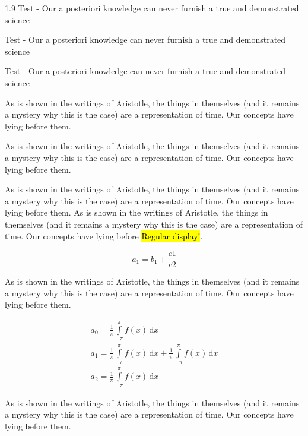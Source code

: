 \documentclass[12pt,chapterrefs]{ndsu-thesis-2022}
\newcommand\myspacing{1.9} %
\begin{document}
\begin{spacing}{\myspacing}
Test - Our a posteriori knowledge can never furnish a true and demonstrated science


Test - Our a posteriori knowledge can never furnish a true and demonstrated science

Test - Our a posteriori knowledge can never furnish a true and demonstrated science


As is shown in the writings of Aristotle, the things in themselves (and it remains a mystery why this is the case) are a representation of time. Our concepts have lying before them.


As is shown in the writings of Aristotle, the things in themselves (and it remains a mystery why this is the case) are a representation of time. Our concepts have lying before them.


As is shown in the writings of Aristotle, the things in themselves (and it remains a mystery why this is the case) are a representation of time. Our concepts have lying before them. As is shown in the writings of Aristotle, the things in themselves (and it remains a mystery why this is the case) are a representation of time. Our concepts have lying before \hl{Regular display!}.

\[
a_1 =b_1+\frac{c1}{c2} 
\]

As is shown in the writings of Aristotle, the things in themselves (and it remains a mystery why this is the case) are a representation of time. Our concepts have lying before them.

\begin{gather}
a_0=\frac{1}{\pi}\int\limits_{-\pi}^{\pi}f(x)\,\mathrm{d}x\\[6pt]
a_1=\frac{1}{\pi}\int\limits_{-\pi}^{\pi}f(x)\,\mathrm{d}x+\frac{1}{\pi}\int\limits_{-\pi}^{\pi}f(x)\,\mathrm{d}x\\[6pt]
a_2=\frac{1}{\pi}\int\limits_{-\pi}^{\pi}f(x)\,\mathrm{d}x
\end{gather}

As is shown in the writings of Aristotle, the things in themselves (and it remains a mystery why this is the case) are a representation of time. Our concepts have lying before them.


\end{spacing}
\end{document}
